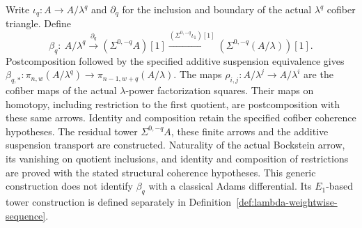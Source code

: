\begin{definition}
  \label{def:finite-lambda-bockstein-maps}
  \leanok
  Write $\iota_q:A\to A/\lambda^q$ and $\partial_q$ for the inclusion and
  boundary of the actual $\lambda^q$ cofiber triangle. Define
  \[
    \beta_q:\ A/\lambda^q\xrightarrow{\partial_q}
       (\Sigma^{0,-q}A)[1]
       \xrightarrow{(\Sigma^{0,-q}\iota_1)[1]}
       (\Sigma^{0,-q}(A/\lambda))[1].
  \]
  Postcomposition followed by the specified additive suspension equivalence
  gives
  $\beta_{q,*}:\pi_{n,w}(A/\lambda^q)\to
    \pi_{n-1,w+q}(A/\lambda)$.
  The maps $\rho_{i,j}:A/\lambda^j\to A/\lambda^i$ are the cofiber maps
  of the actual $\lambda$-power factorization squares. Their maps on homotopy,
  including restriction to the first quotient, are postcomposition with
  these same arrows. Identity and composition retain the specified cofiber
  coherence hypotheses.
  The residual tower $\Sigma^{0,-q}A$, these finite arrows and the additive
  suspension transport are constructed. Naturality of the actual
  Bockstein arrow, its vanishing on quotient inclusions, and identity and
  composition of restrictions are proved with the stated structural
  coherence hypotheses. This generic construction does not identify
  $\beta_q$ with a classical Adams differential.
  Its $E_1$-based tower construction is defined separately in
  Definition~\ref{def:lambda-weightwise-sequence}.
\end{definition}

